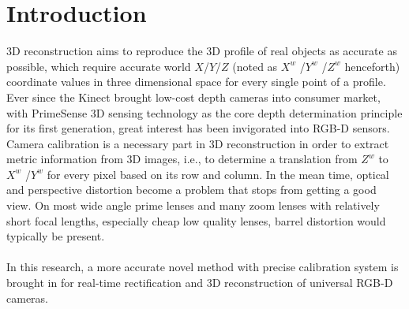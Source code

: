 \chapter{Introduction} %
\label{sens_introduction} %
3D reconstruction aims to reproduce the 3D profile of real objects as accurate as possible, which require accurate world \(X\)/\(Y\)/\(Z\) (noted as \(X^{w}\) /\(Y^{w}\) /\(Z^{w}\)  henceforth) coordinate values in three dimensional space for every single point of a profile. Ever since the Kinect brought low-cost depth cameras into consumer market, with PrimeSense 3D sensing technology as the core depth determination principle for its first generation, great interest has been invigorated into RGB-D sensors. Camera calibration is a necessary part in 3D reconstruction in order to extract metric information from 3D images, i.e., to determine a translation from \(Z^{w}\)  to \(X^{w}\) /\(Y^{w}\)  for every pixel based on its row and column. In the mean time, optical and perspective distortion become a problem that stops from getting a good view. On most wide angle prime lenses and many zoom lenses with relatively short focal lengths,  especially cheap low quality lenses, barrel distortion would typically be present.
\\
\\In this research, a more accurate novel method with precise calibration system is brought in for real-time rectification and 3D reconstruction of universal RGB-D cameras. 

